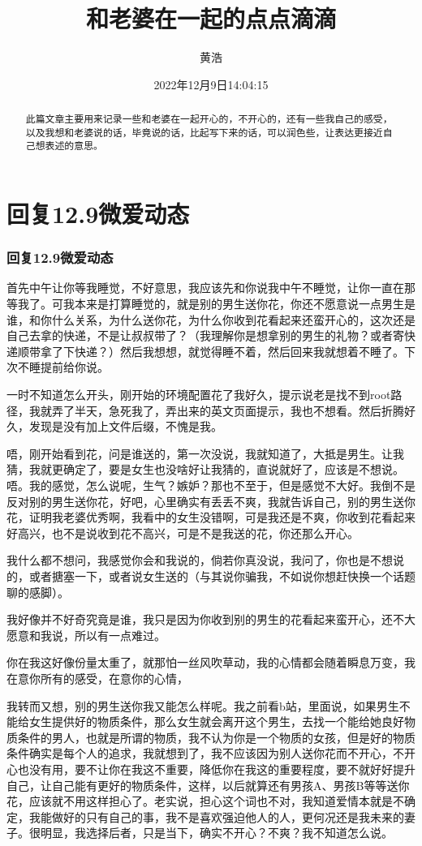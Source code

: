 \documentclass[12pt]{ctexart}
\begin{document}
\title{和老婆在一起的点点滴滴}
\author{黄浩}
\date{2022年12月9日14:04:15}
\begin{abstract}
    此篇文章主要用来记录一些和老婆在一起开心的，不开心的，还有一些我自己的感受，以及我想和老婆说的话，毕竟说的话，比起写下来的话，可以润色些，让表达更接近自己想表述的意思。
\end{abstract}
\maketitle
\tableofcontents
\part{回复12.9微爱动态}
\section{回复12.9微爱动态}
\par 首先中午让你等我睡觉，不好意思，我应该先和你说我中午不睡觉，让你一直在那等我了。可我本来是打算睡觉的，就是别的男生送你花，你还不愿意说一点男生是谁，和你什么关系，为什么送你花，为什么你收到花看起来还蛮开心的，这次还是自己去拿的快递，不是让叔叔带了？（我理解你是想拿别的男生的礼物？或者寄快递顺带拿了下快递？）然后我想想，就觉得睡不着，然后回来我就想着不睡了。下次不睡提前给你说。
\par 一时不知道怎么开头，刚开始的环境配置花了我好久，提示说老是找不到root路径，我就弄了半天，急死我了，弄出来的英文页面提示，我也不想看。然后折腾好久，发现是没有加上文件后缀，不愧是我。
\par 唔，刚开始看到花，问是谁送的，第一次没说，我就知道了，大抵是男生。让我猜，我就更确定了，要是女生也没啥好让我猜的，直说就好了，应该是不想说。唔。我的感觉，怎么说呢，生气？嫉妒？那也不至于，但是感觉不大好。我倒不是反对别的男生送你花，好吧，心里确实有丢丢不爽，我就告诉自己，别的男生送你花，证明我老婆优秀啊，我看中的女生没错啊，可是我还是不爽，你收到花看起来好高兴，也不是说收到花不高兴，可是不是我送的花，你还那么开心。
\par 我什么都不想问，我感觉你会和我说的，倘若你真没说，我问了，你也是不想说的，或者搪塞一下，或者说女生送的（与其说你骗我，不如说你想赶快换一个话题聊的感脚）。
\par 我好像并不好奇究竟是谁，我只是因为你收到别的男生的花看起来蛮开心，还不大愿意和我说，所以有一点难过。
\par 你在我这好像份量太重了，就那怕一丝风吹草动，我的心情都会随着瞬息万变，我在意你所有的感受，在意你的心情，
\par 我转而又想，别的男生送你我又能怎么样呢。我之前看b站，里面说，如果男生不能给女生提供好的物质条件，那么女生就会离开这个男生，去找一个能给她良好物质条件的男人，也就是所谓的物质，我不认为你是一个物质的女孩，但是好的物质条件确实是每个人的追求，我就想到了，我不应该因为别人送你花而不开心，不开心也没有用，要不让你在我这不重要，降低你在我这的重要程度，要不就好好提升自己，让自己能有更好的物质条件，这样，以后就算还有男孩A、男孩B等等送你花，应该就不用这样担心了。老实说，担心这个词也不对，我知道爱情本就是不确定，我能做好的只有自己的事，我不是喜欢强迫他人的人，更何况还是我未来的妻子。很明显，我选择后者，只是当下，确实不开心？不爽？我不知道怎么说。
\end{document}
